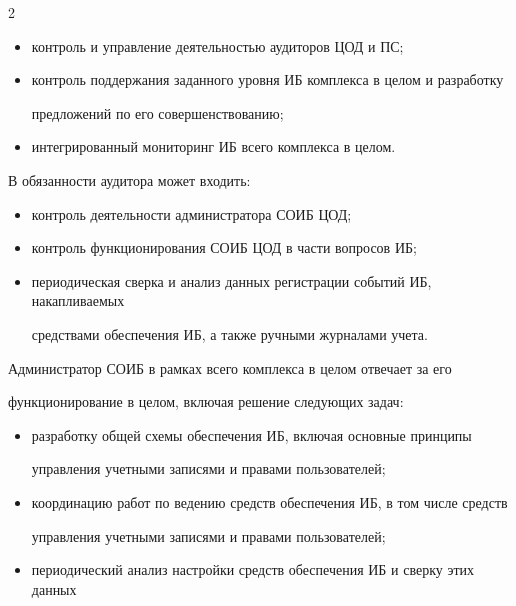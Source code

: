 \begin{multicols}{2}
\begin{itemize}
\item контроль и управление деятельностью аудиторов ЦОД и ПС;


\item  контроль поддержания заданного уровня ИБ комплекса в целом и разработку 


предложений по его совершенствованию;


\item интегрированный мониторинг ИБ всего комплекса в целом.


\end{itemize}





       В обязанности аудитора может входить:


       \begin{itemize}


\item контроль деятельности администратора СОИБ ЦОД;


\item контроль функционирования СОИБ ЦОД в час\-ти вопросов ИБ;


\item периодическая сверка и анализ данных регистрации событий ИБ, накапливаемых 


средствами обеспечения ИБ, а также ручными журналами учета.


\end{itemize}





       Администратор СОИБ в рамках всего комплекса в целом отвечает за его 


функционирование в целом, включая решение следующих задач:


       \begin{itemize}


\item разработку общей схемы обеспечения ИБ, включая основные принципы 


управления учетными записями и правами пользователей;


\item координацию работ по ведению средств обеспечения ИБ, в том числе средств 


управления учетными записями и правами пользователей;


\item периодический анализ настройки средств обеспечения ИБ и сверку этих данных 



\end{itemize}
\end{multicols}
